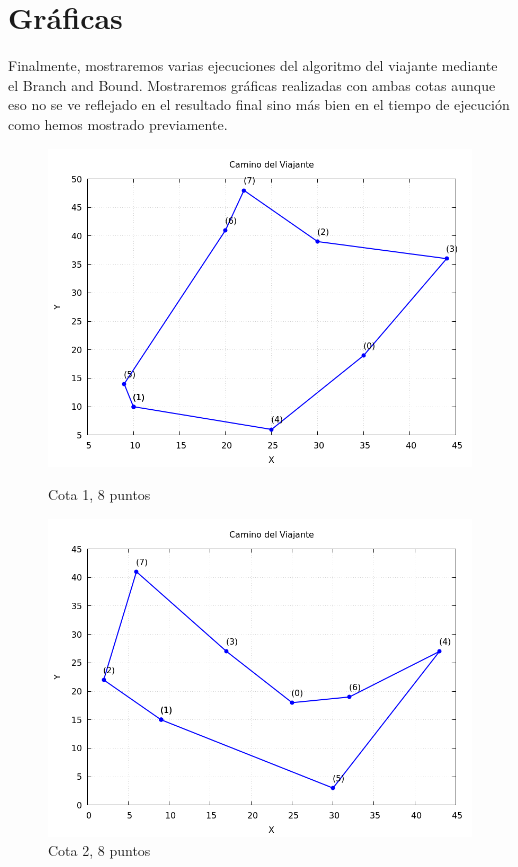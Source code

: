 \documentclass[11pt,openany]{book}
\begin{document}
\section{Gráficas}
Finalmente, mostraremos varias ejecuciones del algoritmo del viajante mediante el Branch and Bound. Mostraremos gráficas realizadas con ambas
cotas aunque eso no se ve reflejado en el resultado final sino más bien en el tiempo de ejecución como hemos mostrado previamente.

\begin{figure}[H]
      \centering
      \begin{minipage}{.48\textwidth}
            \centering
            \includegraphics[width=1\linewidth]{assets/Img/Cota_1_BB/grafico_8_1.png}
            \caption{Cota 1, 8 puntos}
            \label{fig:Cota 1}
      \end{minipage}%
      \begin{minipage}{.48\textwidth}
            \centering
            \includegraphics[width=1\linewidth]{assets/Img/Cota_2_BB/grafico_8_1.png}
            \caption{Cota 2, 8 puntos}
            \label{fig:Cota 2}
      \end{minipage}
\end{figure}
\end{document}
